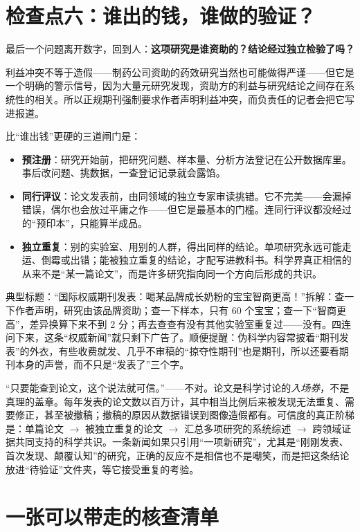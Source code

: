 \section{检查点六：谁出的钱，谁做的验证？}

最后一个问题离开数字，回到人：\textbf{这项研究是谁资助的？结论经过独立检验了吗？}

利益冲突不等于造假——制药公司资助的药效研究当然也可能做得严谨——但它是一个明确的警示信号，因为大量元研究发现，资助方的利益与研究结论之间存在系统性的相关。所以正规期刊强制要求作者声明利益冲突，而负责任的记者会把它写进报道。

比“谁出钱”更硬的三道闸门是：

\begin{itemize}[itemsep=2pt]
\item \textbf{预注册}：研究开始前，把研究问题、样本量、分析方法登记在公开数据库里。事后改问题、挑数据，一查登记记录就会露馅。
\item \textbf{同行评议}：论文发表前，由同领域的独立专家审读挑错。它不完美——会漏掉错误，偶尔也会放过平庸之作——但它是最基本的门槛。连同行评议都没经过的“预印本”，只能算半成品。
\item \textbf{独立重复}：别的实验室、用别的人群，得出同样的结论。单项研究永远可能走运、倒霉或出错；能被独立重复的结论，才配写进教科书。科学界真正相信的从来不是“某一篇论文”，而是许多研究指向同一个方向后形成的共识。
\end{itemize}

典型标题：“国际权威期刊发表：喝某品牌成长奶粉的宝宝智商更高！”拆解：查一下作者声明，研究由该品牌资助；查一下样本，只有 60 个宝宝；查一下“智商更高”，差异换算下来不到 2 分；再去查查有没有其他实验室重复过——没有。四连问下来，这条“权威新闻”就只剩下广告了。顺便提醒：伪科学内容常披着“期刊发表”的外衣，有些收费就发、几乎不审稿的“掠夺性期刊”也是期刊，所以还要看期刊本身的声誉，而不只是“发表了”三个字。

\begin{wuqu}
“只要能查到论文，这个说法就可信。”——不对。论文是科学讨论的\emph{入场券}，不是真理的盖章。每年发表的论文数以百万计，其中相当比例后来被发现无法重复、需要修正，甚至被撤稿；撤稿的原因从数据错误到图像造假都有。可信度的真正阶梯是：单篇论文 $\rightarrow$ 被独立重复的论文 $\rightarrow$ 汇总多项研究的系统综述 $\rightarrow$ 跨领域证据共同支持的科学共识。一条新闻如果只引用“一项新研究”，尤其是“刚刚发表、首次发现、颠覆认知”的研究，正确的反应不是相信也不是嘲笑，而是把这条结论放进“待验证”文件夹，等它接受重复的考验。
\end{wuqu}

\section{一张可以带走的核查清单}

